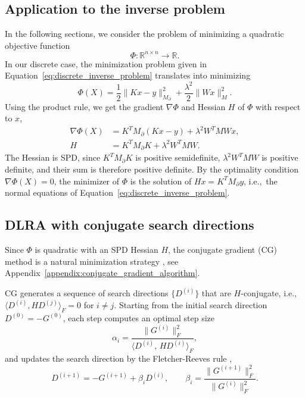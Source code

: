 \subsection{Application to the inverse problem}\label{sec:application_to_inverse_problem}
In the following sections, we consider the problem of minimizing a quadratic objective function
\begin{equation*}
    \Phi: \mathbb{R}^{n \times n} \rightarrow \mathbb R.
\end{equation*}
In our discrete case, the minimization problem given in Equation~\eqref{eq:discrete_inverse_problem} translates into minimizing
\begin{equation*}
    \Phi(X) = \frac 1 2 \|Kx - y\|_{M_\partial}^2
    + \frac{\lambda^2}{2} \| W x \|_M^2.
\end{equation*}
Using the product rule, we get the gradient $\nabla \Phi$ and Hessian $H$ of $\Phi$ with respect to $x$,
\begin{equation*}
    \begin{aligned}
    \nabla \Phi (X) &= K^T M_\partial (K x - y) + \lambda^2 W^T M W x, \\
    H &= K^T M_\partial K + \lambda^2 W^T M W.
    \end{aligned}
\end{equation*}
The Hessian is SPD, since $K^T M_\partial K$ is positive semidefinite, $\lambda^2 W^T M W$ is positive definite, and their sum is therefore positive definite. By the optimality condition $\nabla \Phi (X) = 0$, the minimizer of $\Phi$ is the solution of $H x = K^T M_\partial y$, i.e.,~the normal equations of Equation~\eqref{eq:discrete_inverse_problem}.
%
%
%


\subsection{DLRA with conjugate search directions}
Since $\Phi$ is quadratic with an SPD Hessian $H$, the conjugate gradient (CG) method is a natural minimization strategy \cite{saadIterativeMethodsSparse2003,fletcherFunctionMinimizationConjugate1964,hestenesMethodsConjugateGradients1952}, see Appendix~\ref{appendix:conjugate_gradient_algorithm}.

CG generates a sequence of search directions $\{D^{(i)}\}$ that are $H$-conjugate, i.e., $\langle D^{(i)}, H D^{(j)}\rangle_F = 0$ for $i \neq j$. Starting from the initial search direction $D^{(0)} = -G^{(0)}$, each step computes an optimal step size
\begin{equation*}
    \alpha_i = \frac{\|G^{(i)}\|_F^2}{\langle D^{(i)},\, H D^{(i)}\rangle_F},
\end{equation*}
and updates the search direction by the Fletcher-Reeves rule \cite{fletcherFunctionMinimizationConjugate1964},
\begin{equation}\label{eq:fletcher-reeves}
    D^{(i+1)} = -G^{(i+1)} + \beta_i D^{(i)},
    \qquad
    \beta_i = \frac{\|G^{(i+1)}\|_F^2}{\|G^{(i)}\|_F^2}.
\end{equation}

